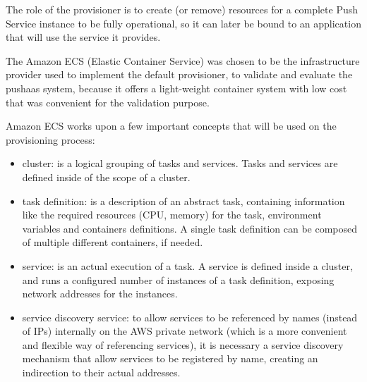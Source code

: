 The role of the provisioner is to create (or remove) resources for a complete Push Service instance to be fully operational, so it can later be bound to an application that will use the service it provides.

The Amazon ECS (Elastic Container Service) was chosen to be the infrastructure provider used to implement the default provisioner, to validate and evaluate the pushaas system, because it offers a light-weight container system with low cost that was convenient for the validation purpose.

Amazon ECS works upon a few important concepts that will be used on the provisioning process:
\begin{itemize}
    \item cluster: is a logical grouping of tasks and services. Tasks and services are defined inside of the scope of a cluster.
    \item task definition: is a description of an abstract task, containing information like the required resources (CPU, memory) for the task, environment variables and containers definitions. A single task definition can be composed of multiple different containers, if needed.
    \item service: is an actual execution of a task. A service is defined inside a cluster, and runs a configured number of instances of a task definition, exposing network addresses for the instances.
    \item service discovery service: to allow services to be referenced by names (instead of IPs) internally on the AWS private network (which is a more convenient and flexible way of referencing services), it is necessary a service discovery mechanism that allow services to be registered by name, creating an indirection to their actual addresses.
\end{itemize}

